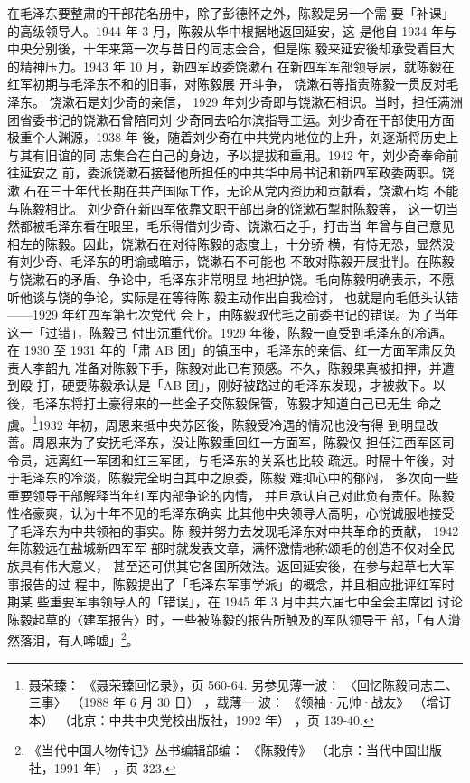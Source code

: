 在毛泽东要整肃的干部花名册中，除了彭德怀之外，陈毅是另一个需
要「补课」的高级领导人。1944 年 3 月，陈毅从华中根据地返回延安，这
是他自 1934 年与中央分别後，十年来第一次与昔日的同志会合，但是陈
毅来延安後却承受着巨大的精神压力。1943 年 10 月，新四军政委饶漱石
在新四军军部领导层，就陈毅在红军初期与毛泽东不和的旧事，对陈毅展
开斗争，
饶漱石等指责陈毅一贯反对毛泽东。
饶漱石是刘少奇的亲信，
1929
年刘少奇即与饶漱石相识。当时，担任满洲团省委书记的饶漱石曾陪同刘
少奇同去哈尔滨指导工运。刘少奇在干部使用方面极重个人渊源，1938 年
後，随着刘少奇在中共党内地位的上升，刘逐渐将历史上与其有旧谊的同
志集合在自己的身边，予以提拔和重用。1942 年，刘少奇奉命前往延安之
前，委派饶漱石接替他所担任的中共华中局书记和新四军政委两职。饶漱
石在三十年代长期在共产国际工作，无论从党内资历和贡献看，饶漱石均
不能与陈毅相比。
刘少奇在新四军依靠文职干部出身的饶漱石掣肘陈毅等，
这一切当然都被毛泽东看在眼里，毛乐得借刘少奇、饶漱石之手，打击当
年曾与自己意见相左的陈毅。因此，饶漱石在对待陈毅的态度上，十分骄
横，有恃无恐，显然没有刘少奇、毛泽东的明谕或暗示，饶漱石不可能也
不敢对陈毅开展批判。在陈毅与饶漱石的矛盾、争论中，毛泽东非常明显
地袒护饶。毛向陈毅明确表示，不愿听他谈与饶的争论，实际是在等待陈
毅主动作出自我检讨，
也就是向毛低头认错——1929 年红四军第七次党代
会上，由陈毅取代毛之前委书记的错误。为了当年这一「过错」，陈毅已
付出沉重代价。1929 年後，陈毅一直受到毛泽东的冷遇。在 1930 至 1931
年的「肃 AB 团」的镇压中，毛泽东的亲信、红一方面军肃反负责人李韶九
准备对陈毅下手，陈毅对此已有预感。不久，陈毅果真被扣押，并遭到殴
打，硬要陈毅承认是「AB 团」，刚好被路过的毛泽东发现，才被救下。以
後，毛泽东将打土豪得来的一些金子交陈毅保管，陈毅才知道自己已无生
命之虞。\footnote{聂荣臻：
《聂荣臻回忆录》，页 560-64. 另参见薄一波：
〈回忆陈毅同志二、三事〉
（1988 年 6 月 30 日）
，载薄一
波：
《领袖·元帅·战友》
（增订本）
（北京：中共中央党校出版社，1992 年）
，页 139-40. }1932 年初，周恩来抵中央苏区後，陈毅受冷遇的情况也没有得
到明显改善。周恩来为了安抚毛泽东，没让陈毅重回红一方面军，陈毅仅
担任江西军区司令员，远离红一军团和红三军团，与毛泽东的关系也比较
疏远。时隔十年後，对于毛泽东的冷淡，陈毅完全明白其中之原委，陈毅
难抑心中的郁闷，
多次向一些重要领导干部解释当年红军内部争论的内情，
并且承认自己对此负有责任。陈毅性格豪爽，认为十年不见的毛泽东确实
比其他中央领导人高明，心悦诚服地接受了毛泽东为中共领袖的事实。陈
毅并努力去发现毛泽东对中共革命的贡献，
1942 年陈毅远在盐城新四军军
部时就发表文章，满怀激情地称颂毛的创造不仅对全民族具有伟大意义，
甚至还可供其它各国所效法。返回延安後，在参与起草七大军事报告的过
程中，陈毅提出了「毛泽东军事学派」的概念，并且相应批评红军时期某
些重要军事领导人的「错误」，在 1945 年 3 月中共六届七中全会主席团
讨论陈毅起草的〈建军报告〉时，一些被陈毅的报告所触及的军队领导干
部，「有人潸然落泪，有人唏嘘」\footnote{《当代中国人物传记》丛书编辑部编：
《陈毅传》
（北京：当代中国出版社，1991 年）
，页 323.}。

